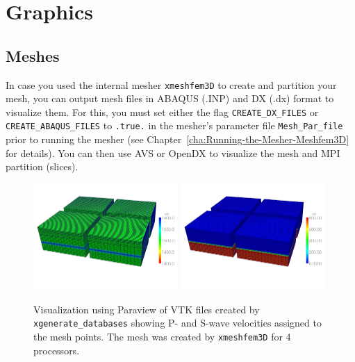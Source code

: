 \chapter{Graphics}

\section{Meshes}\label{sec:Mesh-graphics}

In case you used the internal mesher \texttt{xmeshfem3D} to create
and partition your mesh, you can output mesh files in ABAQUS (.INP)
and DX (.dx) format to visualize them. For this, you must set either
the flag \texttt{CREATE\_DX\_FILES} or \texttt{CREATE\_ABAQUS\_FILES}
to \texttt{.true.} in the mesher's parameter file \texttt{Mesh\_Par\_file}
prior to running the mesher (see Chapter~\ref{cha:Running-the-Mesher-Meshfem3D}
for details). You can then use AVS 
or OpenDX  to visualize the mesh
and MPI partition (slices).

\begin{figure}[htbp]
\noindent \begin{centering}
\includegraphics[width=0.49\textwidth]{figures/vtk_mesh_vp.jpg}
\includegraphics[width=0.49\textwidth]{figures/vtk_mesh_vs.jpg}
\par\end{centering}

\caption{Visualization using Paraview of VTK files created by \texttt{xgenerate\_databases}
showing P- and S-wave velocities assigned to the mesh points. The
mesh was created by \texttt{xmeshfem3D} for 4 processors.}


\label{fig:vtk.mesh}
\end{figure}


